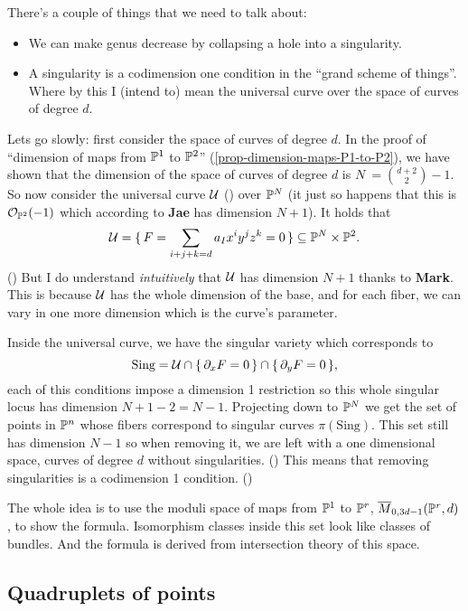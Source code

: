 \documentclass[12pt]{memoir}
\begin{document}
\begin{ptcb}
    There's a couple of things that we need to talk about:
    \begin{itemize}
        \item We can make genus decrease by collapsing a hole into a singularity. 
        \item A singularity is a codimension one condition in the ``grand scheme of things''. Where by this I (intend to) mean the universal curve over the space of curves of degree $d$.
    \end{itemize}
    Lets go slowly: first consider the space of curves of degree $d$. In the proof of ``dimension of maps from $\mathbb{P}^1$ to $\mathbb{P}^2$'' (\ref{prop-dimension-maps-P1-to-P2}), we have shown that the dimension of the space of curves of degree $d$ is $N\:=\binom{d+2}{2}-1$. So now consider the universal curve $\mathcal{U}$ () over $\mathbb{P}^N$ (it just so happens that this is $\mathcal{O}_{\mathbb{P}^2}(-1)$ which according to \textbf{Jae} has dimension $N+1$). It holds that 
    $$\mathcal{U}=\{\,F=\sum_{i+j+k=d}a_Ix^iy^jz^k=0\,\}\subseteq\mathbb{P}^N\times\mathbb{P}^2.$$
    () But I do understand \emph{intuitively} that $\mathcal{U}$ has dimension $N+1$ thanks to \textbf{Mark}. This is because $\mathcal{U}$ has the whole dimension of the base, and for each fiber, we can vary in one more dimension which is the curve's parameter.\par 
    Inside the universal curve, we have the singular variety which corresponds to 
    $$\text{Sing}=\mathcal{U}\cap\{\,\partial_xF=0\,\}\cap\{\,\partial_yF=0\,\},$$
    each of this conditions impose a dimension 1 restriction so this whole singular locus has dimension $N+1-2=N-1$. Projecting down to $\mathbb{P}^N$ we get the set of points in $\mathbb{P}^n$ whose fibers correspond to singular curves $\pi(\text{Sing})$. This set still has dimension $N-1$ so when removing it, we are left with a one dimensional space, curves of degree $d$ without singularities. () This means that removing singularities is a codimension 1 condition. ()
\end{ptcb}

The whole idea is to use the moduli space of maps from $\mathbb{P}^1$ to $\mathbb{P}^r$, $\overline M_{0,3d-1}(\mathbb{P}^r,d)$, to show the formula. Isomorphism classes inside this set look like classes of bundles. And the formula is derived from intersection theory of this space. 

\subsection{Quadruplets of points}
\end{document}
